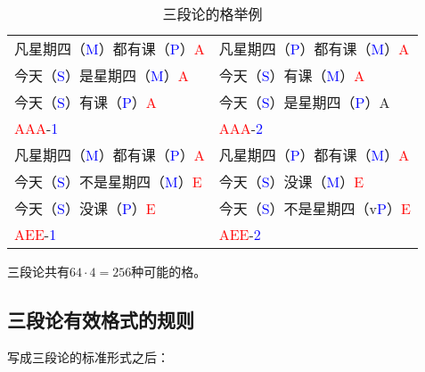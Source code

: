 \documentclass[12pt,onecolumn,a4paper]{book}
\numberwithin{table}{subsection}
\numberwithin{equation}{subsection}
\begin{document}
\begin{table}[h]
\begin{center}
    \begin{tabular}{l|l}
        凡星期四（\textcolor{blue}{M}）都有课（\textcolor{blue}{P}）\textcolor{red}{A}& 凡星期四（\textcolor{blue}{P}）都有课（\textcolor{blue}{M}）\textcolor{red}{A}\\
        今天（\textcolor{blue}{S}）是星期四（\textcolor{blue}{M}）\textcolor{red}{A} & 今天（\textcolor{blue}{S}）有课（\textcolor{blue}{M}）\textcolor{red}{A}\\
        \hdashline
        今天（\textcolor{blue}{S}）有课（\textcolor{blue}{P}）\textcolor{red}{A} & 今天（\textcolor{blue}{S}）是星期四（\textcolor{blue}{P}）A\\
        \hline
        \textcolor{red}{AAA}-\textcolor{blue}{1}&\textcolor{red}{AAA}-\textcolor{blue}{2}\\
        \hline
        凡星期四（\textcolor{blue}{M}）都有课（\textcolor{blue}{P}）\textcolor{red}{A} & 凡星期四（\textcolor{blue}{P}）都有课（\textcolor{blue}{M}）\textcolor{red}{A}\\
        今天（\textcolor{blue}{S}）不是星期四（\textcolor{blue}{M}）\textcolor{red}{E} & 今天（\textcolor{blue}{S}）没课（\textcolor{blue}{M}）\textcolor{red}{E}\\
        \hdashline
        今天（\textcolor{blue}{S}）没课（\textcolor{blue}{P}）\textcolor{red}{E} &今天（\textcolor{blue}{S}）不是星期四（v\textcolor{blue}{P}）\textcolor{red}{E}\\
        \hline
        \textcolor{red}{AEE}-\textcolor{blue}{1}&\textcolor{red}{AEE}-\textcolor{blue}{2}\\
    \end{tabular}
    \caption{三段论的格举例}
\end{center}
\end{table}

三段论共有$64\cdot4=256$种可能的格。

\subsection{三段论有效格式的规则}

写成三段论的标准形式之后：
\end{document}
